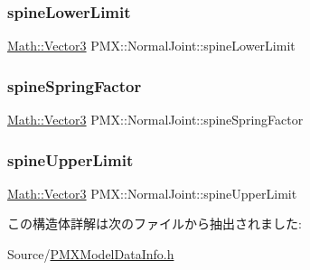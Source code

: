 \subsubsection{\texorpdfstring{spine\+Lower\+Limit}{spineLowerLimit}}
{\footnotesize\ttfamily \mbox{\hyperlink{struct_math_1_1_vector3}{Math\+::\+Vector3}} P\+M\+X\+::\+Normal\+Joint\+::spine\+Lower\+Limit}

\mbox{\label{struct_p_m_x_1_1_normal_joint_add7c59899aad19b22d5d267544661373}} 
\subsubsection{\texorpdfstring{spine\+Spring\+Factor}{spineSpringFactor}}
{\footnotesize\ttfamily \mbox{\hyperlink{struct_math_1_1_vector3}{Math\+::\+Vector3}} P\+M\+X\+::\+Normal\+Joint\+::spine\+Spring\+Factor}

\mbox{\label{struct_p_m_x_1_1_normal_joint_aaf74dd6ffb85b798ae05c4fbaee4255f}} 
\subsubsection{\texorpdfstring{spine\+Upper\+Limit}{spineUpperLimit}}
{\footnotesize\ttfamily \mbox{\hyperlink{struct_math_1_1_vector3}{Math\+::\+Vector3}} P\+M\+X\+::\+Normal\+Joint\+::spine\+Upper\+Limit}



この構造体詳解は次のファイルから抽出されました\+:\begin{DoxyCompactItemize}
\item 
Source/\mbox{\hyperlink{_p_m_x_model_data_info_8h}{P\+M\+X\+Model\+Data\+Info.\+h}}\end{DoxyCompactItemize}
